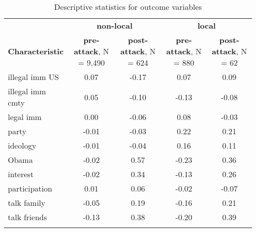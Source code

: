 \begin{table}[H]

\caption{\label{tab:descriptives}Descriptive statistics for outcome variables}
\centering
\fontsize{9}{11}\selectfont
\begin{tabular}[t]{lcccc}
\toprule
\multicolumn{1}{c}{ } & \multicolumn{2}{c}{\textbf{non-local}} & \multicolumn{2}{c}{\textbf{local}} \\
\cmidrule(l{3pt}r{3pt}){2-3} \cmidrule(l{3pt}r{3pt}){4-5}
\textbf{Characteristic} & \textbf{pre-attack}, N = 9,490 & \textbf{post-attack}, N = 624 & \textbf{pre-attack}, N = 880 & \textbf{post-attack}, N = 62\\
\midrule
illegal imm US & 0.07 & -0.17 & 0.07 & 0.09\\
illegal imm cmty & 0.05 & -0.10 & -0.13 & -0.08\\
legal imm & 0.00 & -0.06 & 0.08 & -0.03\\
party & -0.01 & -0.03 & 0.22 & 0.21\\
ideology & -0.01 & -0.04 & 0.16 & 0.11\\
Obama & -0.02 & 0.57 & -0.23 & 0.36\\
interest & -0.02 & 0.34 & -0.13 & 0.26\\
participation & 0.01 & 0.06 & -0.02 & -0.07\\
talk family & -0.05 & 0.19 & -0.16 & 0.21\\
talk friends & -0.13 & 0.38 & -0.20 & 0.39\\
\bottomrule
\multicolumn{5}{l}{\rule{0pt}{1em}}\\
\end{tabular}
\end{table}
